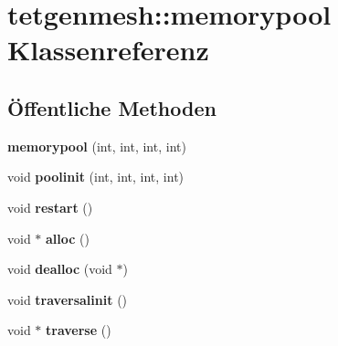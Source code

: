 \hypertarget{classtetgenmesh_1_1memorypool}{\section{tetgenmesh\-:\-:memorypool Klassenreferenz}
\label{classtetgenmesh_1_1memorypool}
}
\subsection*{Öffentliche Methoden}
\begin{DoxyCompactItemize}
\item 
\hypertarget{classtetgenmesh_1_1memorypool_a11c634d40b58e7a23cffb0ca1e9fcbec}{{\bfseries memorypool} (int, int, int, int)}\label{classtetgenmesh_1_1memorypool_a11c634d40b58e7a23cffb0ca1e9fcbec}

\item 
\hypertarget{classtetgenmesh_1_1memorypool_af1e55812acd2838a7566ea97f7af85c1}{void {\bfseries poolinit} (int, int, int, int)}\label{classtetgenmesh_1_1memorypool_af1e55812acd2838a7566ea97f7af85c1}

\item 
\hypertarget{classtetgenmesh_1_1memorypool_a8a34eeaa526e3a27ac9187ff1ead2938}{void {\bfseries restart} ()}\label{classtetgenmesh_1_1memorypool_a8a34eeaa526e3a27ac9187ff1ead2938}

\item 
\hypertarget{classtetgenmesh_1_1memorypool_a9631e38a788a91ae067a756232b515ab}{void $\ast$ {\bfseries alloc} ()}\label{classtetgenmesh_1_1memorypool_a9631e38a788a91ae067a756232b515ab}

\item 
\hypertarget{classtetgenmesh_1_1memorypool_a0329d16675985efd7fd1e0a0630cabf7}{void {\bfseries dealloc} (void $\ast$)}\label{classtetgenmesh_1_1memorypool_a0329d16675985efd7fd1e0a0630cabf7}

\item 
\hypertarget{classtetgenmesh_1_1memorypool_a623b101e4e2f249d8b7e5dba65c3f7e2}{void {\bfseries traversalinit} ()}\label{classtetgenmesh_1_1memorypool_a623b101e4e2f249d8b7e5dba65c3f7e2}

\item 
\hypertarget{classtetgenmesh_1_1memorypool_a151fe73459d0fa9a7262d0030fecf291}{void $\ast$ {\bfseries traverse} ()}\label{classtetgenmesh_1_1memorypool_a151fe73459d0fa9a7262d0030fecf291}

\end{DoxyCompactItemize}
